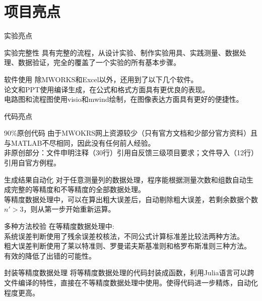 \documentclass{beamer}
\begin{document}
\section{项目亮点}
	\begin{frame}{实验亮点}
		\begin{block}{实验完整性}
			具有完整的流程，从设计实验、制作实验用具、实践测量、数据处理、数据验证，完全的覆盖了一个实验的所有基本步骤。
		\end{block}
		\begin{block}{软件使用}
			除MWORKS和Excel以外，还用到了以下几个软件。\\
			论文和PPT使用\LaTeXe 编译生成，在公式和格式方面具有更优良的表现。\\
			电路图和流程图使用visio和mwind绘制，在图像表达方面具有更好的便捷性。\\
			
		\end{block}
	\end{frame}
	\begin{frame}{代码亮点}
		\begin{block}{90$\%$原创代码}
			由于MWOKRS网上资源较少（只有官方文档和少部分官方资料）且与MATLAB不尽相同，因此没有任何前人经验。\\
			非原创部分：文件申明注释（30行）引用自反馈三级项目要求；文件导入（12行）引用自官方例程。
		\end{block}
		\begin{block}{生成结果自动化}
			对于任意测量列的数据处理，程序能根据测量次数和组数自动生成完整的等精度和不等精度的全部数据处理。\\
			等精度数据处理中，可以在算出粗大误差后，自动剔除粗大误差，若剩余数据个数$n'>3$，则从第一步开始重新运算。
		\end{block}
	\end{frame}
	\begin{frame}
		\begin{block}{多种方法校验}
			在等精度数据处理中:\\
			系统误差判断使用了残余误差校核法，不同公式计算标准差比较法两种方法。\\
			粗大误差判断使用了莱以特准则、罗曼诺夫斯基准则和格罗布斯准则三种方法。\\
			有效的降低了出错的可能性。
		\end{block}
		\begin{block}{封装等精度数据处理}
			将等精度数据处理的代码封装成函数，利用Julia语言可以跨文件编译的特性，直接在不等精度数据处理中使用。使得代码进一步精炼，自动化程度更高。
		\end{block}
	\end{frame}
\end{document}
